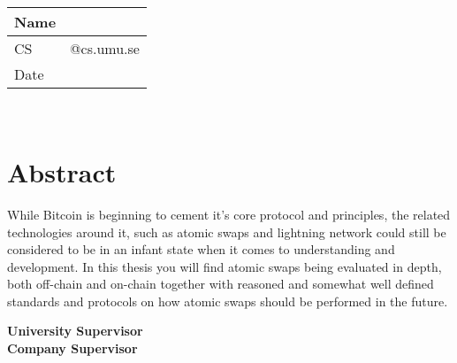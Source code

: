 \begin{titlepage}
	\thispagestyle{empty}
	\noindent {\large \MakeUppercase\university \\
				\instution \\
				\pagetypename \\
			  }

	\begin{center}
	\Large{\textbf{\titleFrontPage}}\\[7pt]

	\Large{\assignmentname}\\[40.0pt]
    
	\begin{tabular}{p{2cm}p{9.5cm}}
		\hline
		Name &  \hfill \name\\\hline
		CS & \hfill \csuser  @cs.umu.se \\\hline
		Date & \hfill \datemade\\ \hline
	\end{tabular}\\
	
	\vspace{10mm}
	\fontsize{10}{12}\selectfont
	\section*{Abstract}\vspace{-5mm}
	While Bitcoin is beginning to cement it's core protocol and principles, the related technologies around it, such as atomic swaps and lightning network could still be considered to be in an infant state when it comes to understanding and development. In this thesis you will find atomic swaps being evaluated in depth, both off-chain and on-chain together with reasoned and somewhat well defined standards and protocols on how atomic swaps should be performed in the future.
    \vfill
    
	\large{\textbf{University Supervisor\\}\usupervisor}
	\large{\textbf{Company Supervisor\\}\csupervisor}
	\end{center}
	\thispagestyle{empty}
\end{titlepage}
